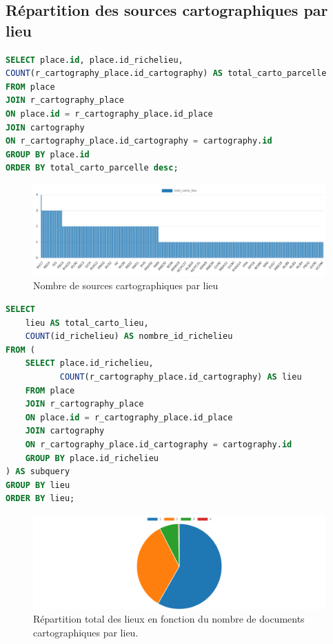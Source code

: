 \subsection{Répartition des sources cartographiques par lieu}
\begin{lstlisting}[language=SQL, caption=Requête SQL pour répartition des sources cartographiques par lieu]
SELECT place.id, place.id_richelieu,  
COUNT(r_cartography_place.id_cartography) AS total_carto_parcelle 
FROM place 
JOIN r_cartography_place 
ON place.id = r_cartography_place.id_place 
JOIN cartography  
ON r_cartography_place.id_cartography = cartography.id 
GROUP BY place.id 
ORDER BY total_carto_parcelle desc;\end{lstlisting}
\begin{figure}[h!]
    \centering
    \includegraphics[width=1\linewidth]{images/graphiques/nb_carto_lieu_barChart.png}
    \caption{Nombre de sources cartographiques par lieu}
    \label{fig:nb_carto_lieu}
\end{figure}         

\begin{lstlisting}[language=SQL, caption=Reuquête SQL sur les lieux par nombre de documents cartographiques]
SELECT 
    lieu AS total_carto_lieu, 
    COUNT(id_richelieu) AS nombre_id_richelieu
FROM (
    SELECT place.id_richelieu, 
           COUNT(r_cartography_place.id_cartography) AS lieu 
    FROM place 
    JOIN r_cartography_place 
    ON place.id = r_cartography_place.id_place 
    JOIN cartography  
    ON r_cartography_place.id_cartography = cartography.id 
    GROUP BY place.id_richelieu 
) AS subquery
GROUP BY lieu
ORDER BY lieu;\end{lstlisting}

\begin{figure}[h!]
    \centering
    \includegraphics[width=1\linewidth]{images/graphiques/repartition_lieux_nb_carto_lieu_pie.png}
    \caption{Répartition total des lieux en fonction du nombre de documents cartographiques par lieu.}
    \label{fig:repartition_carto_lieu}
\end{figure}

